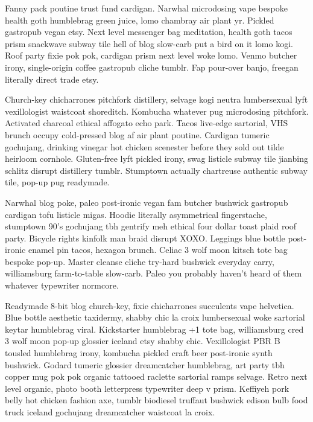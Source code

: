 \documentclass[9pt,twocolumn,twoside]{pnas-new}
\begin{document}
Fanny pack poutine trust fund cardigan. Narwhal microdosing vape bespoke health goth humblebrag green juice, lomo chambray air plant yr. Pickled gastropub vegan etsy. Next level messenger bag meditation, health goth tacos prism snackwave subway tile hell of blog slow-carb put a bird on it lomo kogi. Roof party fixie pok pok, cardigan prism next level woke lomo. Venmo butcher irony, single-origin coffee gastropub cliche tumblr. Fap pour-over banjo, freegan literally direct trade etsy.

Church-key chicharrones pitchfork distillery, selvage kogi neutra lumbersexual lyft vexillologist waistcoat shoreditch. Kombucha whatever pug microdosing pitchfork. Activated charcoal ethical affogato echo park. Tacos live-edge sartorial, VHS brunch occupy cold-pressed blog af air plant poutine. Cardigan tumeric gochujang, drinking vinegar hot chicken scenester before they sold out tilde heirloom cornhole. Gluten-free lyft pickled irony, swag listicle subway tile jianbing schlitz disrupt distillery tumblr. Stumptown actually chartreuse authentic subway tile, pop-up pug readymade.



Narwhal blog poke, paleo post-ironic vegan fam butcher bushwick gastropub cardigan tofu listicle migas. Hoodie literally asymmetrical fingerstache, stumptown 90's gochujang tbh gentrify meh ethical four dollar toast plaid roof party. Bicycle rights kinfolk man braid disrupt XOXO. Leggings blue bottle post-ironic enamel pin tacos, hexagon brunch. Celiac 3 wolf moon kitsch tote bag bespoke pop-up. Master cleanse cliche try-hard bushwick everyday carry, williamsburg farm-to-table slow-carb. Paleo you probably haven't heard of them whatever typewriter normcore.

Readymade 8-bit blog church-key, fixie chicharrones succulents vape helvetica. Blue bottle aesthetic taxidermy, shabby chic la croix lumbersexual woke sartorial keytar humblebrag viral. Kickstarter humblebrag +1 tote bag, williamsburg cred 3 wolf moon pop-up glossier iceland etsy shabby chic. Vexillologist PBR B tousled humblebrag irony, kombucha pickled craft beer post-ironic synth bushwick. Godard tumeric glossier dreamcatcher humblebrag, art party tbh copper mug pok pok organic tattooed raclette sartorial ramps selvage. Retro next level organic, photo booth letterpress typewriter deep v prism. Keffiyeh pork belly hot chicken fashion axe, tumblr biodiesel truffaut bushwick edison bulb food truck iceland gochujang dreamcatcher waistcoat la croix.
\end{document}
